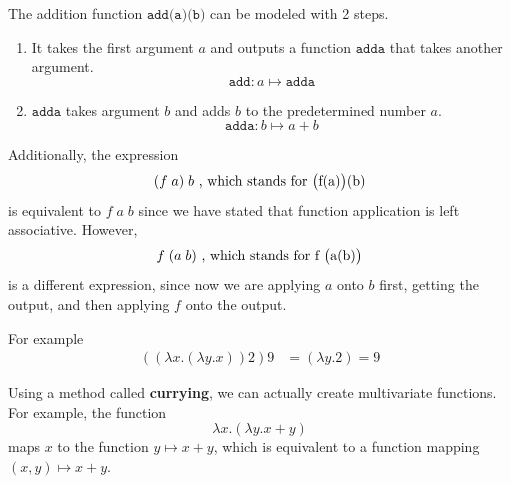  \begin{example}
    \label{ex:addition-in-the-lambda-calculus}
  The addition function $\texttt{add(a)(b)}$ can be modeled with 2 steps. 
  \begin{enumerate}
      \item It takes the first argument $a$ and outputs a function $\texttt{adda}$ that takes another argument. 
      \begin{equation}
        \texttt{add}: a \mapsto \texttt{adda}
      \end{equation}
      \item $\texttt{adda}$ takes argument $b$ and adds $b$ to the predetermined number $a$.
      \begin{equation}
        \texttt{adda}: b \mapsto a + b
      \end{equation}
  \end{enumerate}
  \end{example}

  Additionally, the expression 
  \begin{equation}
    (f \;a)\;b \text{ , which stands for \big(f(a)\big)(b)}
  \end{equation}
  is equivalent to $f\;a\;b$ since we have stated that function application is left associative. However,
  \begin{equation}
    f\;(a\;b) \text{ , which stands for f \big(a(b)\big)}
  \end{equation}
  is a different expression, since now we are applying $a$ onto $b$ first, getting the output, and then applying $f$ onto the output. 

  For example 
  \begin{align*}
      ((\lambda x.(\lambda y.x)) 2) 9 & = (\lambda y.2) = 9
  \end{align*}

  Using a method called \textbf{currying}, we can actually create multivariate functions. For example, the function 
  \begin{equation}
    \lambda x. (\lambda y.x + y)
  \end{equation}
  maps $x$ to the function $y \mapsto x + y$, which is equivalent to a function mapping $(x, y) \mapsto x + y$. 

